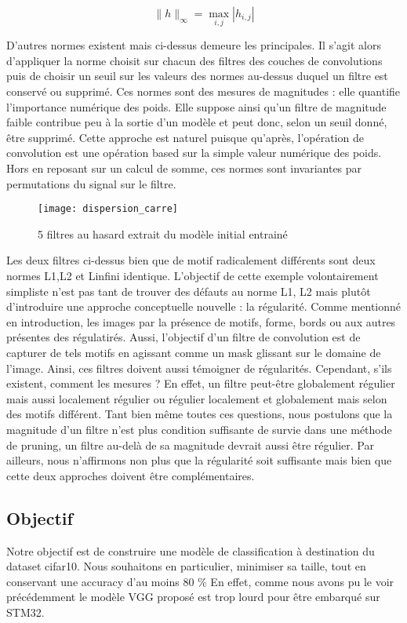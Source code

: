 \documentclass[12pt,a4paper]{article}
\begin{document}
\[
\|h\|_\infty = \max_{i,j} |h_{i,j}|
\]


D'autres normes existent mais ci-dessus demeure les principales. 
Il s'agit alors d'appliquer la norme choisit sur chacun des filtres des couches de convolutions puis de choisir un seuil sur les valeurs des normes au-dessus duquel un filtre est conservé ou supprimé. 
Ces normes sont des mesures de magnitudes : elle quantifie l'importance numérique des poids. Elle suppose ainsi qu'un filtre de magnitude faible contribue peu à la sortie d'un modèle et peut donc, selon un seuil donné, être supprimé. 
Cette approche est naturel puisque qu'après, l'opération de convolution est une opération based sur la simple valeur numérique des poids. 
Hors en reposant sur un calcul de somme, ces normes sont invariantes par permutations du signal sur le filtre.

\begin{figure}[H] %
    \centering    %
    \texttt{[image: dispersion\_carre]} %
    \caption{5 filtres au hasard extrait du modèle initial entrainé} %
    \label{fig:mon_image} %
\end{figure}
Les deux filtres ci-dessus bien que de motif radicalement différents sont deux normes L1,L2 et Linfini identique. 
L'objectif de cette exemple volontairement simpliste n'est pas tant de trouver des défauts au norme L1, L2 mais plutôt d'introduire une approche conceptuelle nouvelle : la régularité.
Comme mentionné en introduction, les images par la présence de motifs, forme, bords ou aux autres présentes des régulatirés. Aussi, l'objectif d'un filtre de convolution est de capturer de tels motifs en agissant comme un mask glissant sur le domaine de l'image. Ainsi, ces filtres doivent aussi témoigner de régularités. 
Cependant, s'ils existent, comment les mesures ? En effet, un filtre peut-être globalement régulier mais aussi localement régulier ou régulier localement et globalement mais selon des motifs différent. 
Tant bien même toutes ces questions, nous postulons que la magnitude d'un filtre n'est plus condition suffisante de survie dans une méthode de pruning, un filtre au-delà de sa magnitude devrait aussi être régulier. 
Par ailleurs, nous n'affirmons non plus que la régularité soit suffisante mais bien que cette deux approches doivent être complémentaires. 
\subsection{Objectif}
Notre objectif est de construire une modèle de classification à destination du dataset cifar10. Nous souhaitons en particulier, minimiser sa taille, tout en conservant une accuracy d'au moins 80 \% 
En effet, comme nous avons pu le voir précédemment le modèle VGG proposé est trop lourd pour être embarqué sur STM32. 
\end{document}
